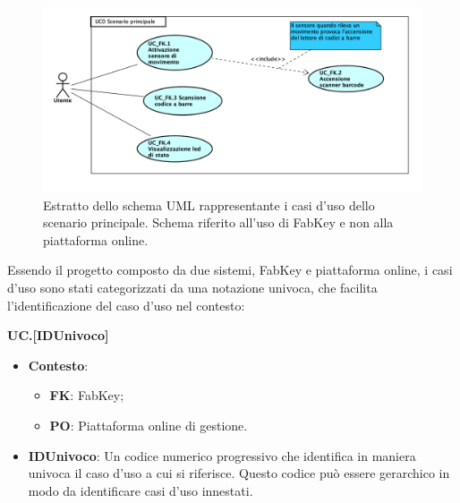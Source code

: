 \begin{figure}[H]
	\begin{center}
	\includegraphics[scale=0.4]{immagini/usecase/scenario_principale.png}
	\caption{Estratto dello schema UML rappresentante i casi d'uso dello scenario principale. Schema riferito all'uso di FabKey e non alla piattaforma online.}
	\end{center}
\end{figure}

Essendo il progetto composto da due sistemi, FabKey e piattaforma online, i casi d'uso sono stati categorizzati da una notazione univoca, che facilita l'identificazione del caso d'uso nel contesto:

\begin{center}
\textbf{UC\textunderscore [Contesto].[IDUnivoco]}
\end{center}

\begin{itemize}
\item \textbf{Contesto}:
\begin{itemize}
\item \textbf{FK}: FabKey;
\item \textbf{PO}: Piattaforma online di gestione.
\end{itemize}

\item \textbf{IDUnivoco}: Un codice numerico progressivo che identifica in maniera univoca il caso d'uso a cui si riferisce. Questo codice può essere gerarchico in modo da identificare casi d'uso innestati.
\end{itemize}

